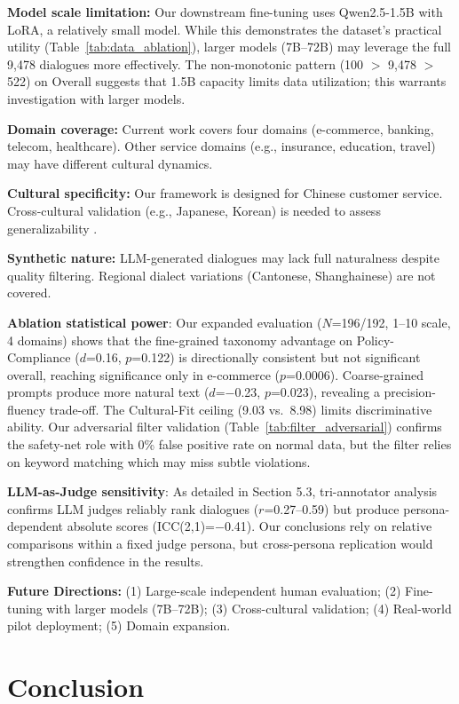 \documentclass[11pt]{article}
\begin{document}
\begin{table}[t]
\textbf{Model scale limitation:} Our downstream fine-tuning uses Qwen2.5-1.5B with LoRA, a relatively small model. While this demonstrates the dataset's practical utility (Table~\ref{tab:data_ablation}), larger models (7B--72B) may leverage the full 9,478 dialogues more effectively. The non-monotonic pattern (100 $>$ 9,478 $>$ 522) on Overall suggests that 1.5B capacity limits data utilization; this warrants investigation with larger models.

\textbf{Domain coverage:} Current work covers four domains (e-commerce, banking, telecom, healthcare). Other service domains (e.g., insurance, education, travel) may have different cultural dynamics.

\textbf{Cultural specificity:} Our framework is designed for Chinese customer service. Cross-cultural validation (e.g., Japanese, Korean) is needed to assess generalizability \cite{CARE_2024}.

\textbf{Synthetic nature:} LLM-generated dialogues may lack full naturalness despite quality filtering. Regional dialect variations (Cantonese, Shanghainese) are not covered.

\textbf{Ablation statistical power}: Our expanded evaluation ($N$=196/192, 1--10 scale, 4 domains) shows that the fine-grained taxonomy advantage on Policy-Compliance ($d$=0.16, $p$=0.122) is directionally consistent but not significant overall, reaching significance only in e-commerce ($p$=0.0006). Coarse-grained prompts produce more natural text ($d$=$-$0.23, $p$=0.023), revealing a precision-fluency trade-off. The Cultural-Fit ceiling (9.03 vs.\ 8.98) limits discriminative ability. Our adversarial filter validation (Table~\ref{tab:filter_adversarial}) confirms the safety-net role with 0\% false positive rate on normal data, but the filter relies on keyword matching which may miss subtle violations.

\textbf{LLM-as-Judge sensitivity}: As detailed in Section 5.3, tri-annotator analysis confirms LLM judges reliably rank dialogues ($r$=0.27--0.59) but produce persona-dependent absolute scores (ICC(2,1)=$-$0.41). Our conclusions rely on relative comparisons within a fixed judge persona, but cross-persona replication would strengthen confidence in the results.

\textbf{Future Directions:} (1) Large-scale independent human evaluation; (2) Fine-tuning with larger models (7B--72B); (3) Cross-cultural validation; (4) Real-world pilot deployment; (5) Domain expansion.


\section{Conclusion}


\end{table}
\end{document}
